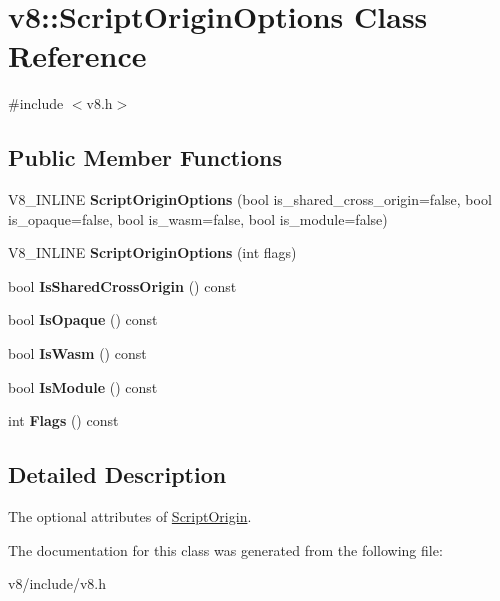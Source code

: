 \hypertarget{classv8_1_1ScriptOriginOptions}{}\section{v8\+:\+:Script\+Origin\+Options Class Reference}
\label{classv8_1_1ScriptOriginOptions}


{\ttfamily \#include $<$v8.\+h$>$}

\subsection*{Public Member Functions}
\begin{DoxyCompactItemize}
\item 
\mbox{\label{classv8_1_1ScriptOriginOptions_ae041fe05628cdd2d434c8780f45ac1e4}} 
V8\+\_\+\+I\+N\+L\+I\+NE {\bfseries Script\+Origin\+Options} (bool is\+\_\+shared\+\_\+cross\+\_\+origin=false, bool is\+\_\+opaque=false, bool is\+\_\+wasm=false, bool is\+\_\+module=false)
\item 
\mbox{\label{classv8_1_1ScriptOriginOptions_a5c814c5602db2c9ed5c6bc7f05b1d430}} 
V8\+\_\+\+I\+N\+L\+I\+NE {\bfseries Script\+Origin\+Options} (int flags)
\item 
\mbox{\label{classv8_1_1ScriptOriginOptions_af899dc2dfbcfdbe84eb57ca5f6e92c86}} 
bool {\bfseries Is\+Shared\+Cross\+Origin} () const
\item 
\mbox{\label{classv8_1_1ScriptOriginOptions_ab6fb2e1fee9bf7cd5a4b141c3abc5df3}} 
bool {\bfseries Is\+Opaque} () const
\item 
\mbox{\label{classv8_1_1ScriptOriginOptions_a31e78eb1c657b0cf029116b6147f03a5}} 
bool {\bfseries Is\+Wasm} () const
\item 
\mbox{\label{classv8_1_1ScriptOriginOptions_a30b72cba616f576272a29b6e199c9c35}} 
bool {\bfseries Is\+Module} () const
\item 
\mbox{\label{classv8_1_1ScriptOriginOptions_ad66acb13746ba12f6b5177c215e4d10d}} 
int {\bfseries Flags} () const
\end{DoxyCompactItemize}


\subsection{Detailed Description}
The optional attributes of \mbox{\hyperlink{classv8_1_1ScriptOrigin}{Script\+Origin}}. 

The documentation for this class was generated from the following file\+:\begin{DoxyCompactItemize}
\item 
v8/include/v8.\+h\end{DoxyCompactItemize}
